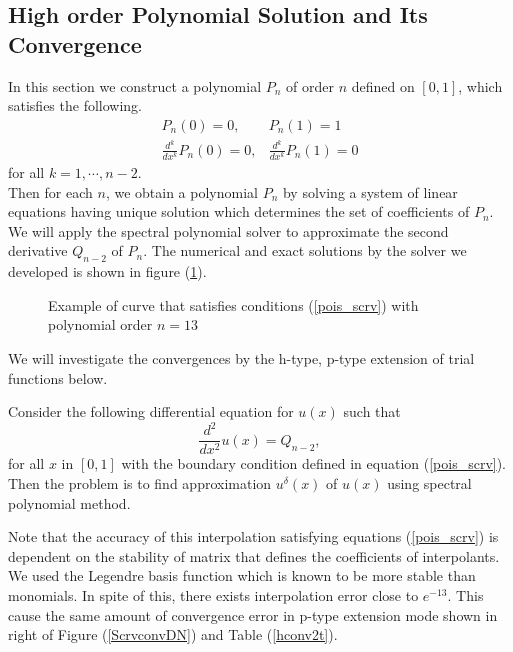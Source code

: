 
\subsection {High order Polynomial Solution and Its Convergence}

In this section we construct a polynomial $P_n$ of order $n$ defined on $[0,1]$, which satisfies the following.
\begin{eqnarray}
\label{pois_scrv}
    P_n(0) = 0, &P_n(1) = 1 \\
    \frac{d^k}{dx^k}P_n(0) = 0, &\frac{d^k}{dx^k}P_n(1) = 0
\end{eqnarray}
for all $k = 1, \cdots, n-2$. \\
Then for each $n$, we obtain a polynomial $P_n$ by solving a system of linear equations having unique solution which determines the set of coefficients of $P_n$. We will apply the spectral polynomial solver to approximate the second derivative $Q_{n-2}$ of $P_n$.
The numerical and exact solutions by the solver we developed is shown in figure (\ref{scrvsol}).


\begin{figure}[h]
    \begin{center}
    \caption{\label{scrvsol}Example of curve that satisfies conditions (\ref{pois_scrv}) with polynomial order $n=13$}
    \end{center}
\end{figure}
We will investigate the convergences by the h-type, p-type extension of trial functions below.

\begin{problem}
Consider the following differential equation for $u(x)$ such that
\begin{equation}
\label{poi_poly}
    \frac{d^2}{dx^2} u(x) = Q_{n-2},
\end{equation}
for all $x$ in $[0, 1]$ with the boundary condition defined in equation (\ref{pois_scrv}). Then the problem is to find approximation $u^{\delta}(x)$ of $u(x)$ using spectral polynomial method.
\end{problem}

Note that the accuracy of this interpolation satisfying equations (\ref{pois_scrv}) is dependent on the stability of matrix that defines the coefficients of interpolants. We used the Legendre basis function which is known to be more stable than monomials. In spite of this, there exists interpolation error close to $e^{-13}$. This cause the same amount of convergence error in p-type extension mode shown in right of Figure (\ref{ScrvconvDN}) and Table (\ref{hconv2t}).

